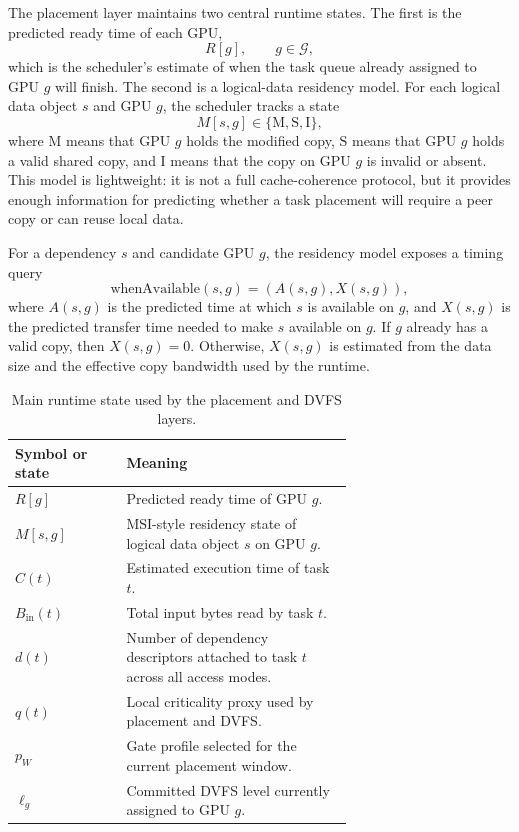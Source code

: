 The placement layer maintains two central runtime states. The first is the predicted ready time of each GPU,
\begin{equation}
R[g], \qquad g\in\mathcal{G},
\end{equation}
which is the scheduler's estimate of when the task queue already assigned to GPU $g$ will finish. The second is a logical-data residency model. For each logical data object $s$ and GPU $g$, the scheduler tracks a state
\begin{equation}
M[s,g]\in\{\mathrm{M},\mathrm{S},\mathrm{I}\},
\end{equation}
where $\mathrm{M}$ means that GPU $g$ holds the modified copy, $\mathrm{S}$ means that GPU $g$ holds a valid shared copy, and $\mathrm{I}$ means that the copy on GPU $g$ is invalid or absent. This model is lightweight: it is not a full cache-coherence protocol, but it provides enough information for predicting whether a task placement will require a peer copy or can reuse local data.

For a dependency $s$ and candidate GPU $g$, the residency model exposes a timing query
\begin{equation}
\mathrm{whenAvailable}(s,g)
=
\left(
A(s,g),X(s,g)
\right),
\end{equation}
where $A(s,g)$ is the predicted time at which $s$ is available on $g$, and $X(s,g)$ is the predicted transfer time needed to make $s$ available on $g$. If $g$ already has a valid copy, then $X(s,g)=0$. Otherwise, $X(s,g)$ is estimated from the data size and the effective copy bandwidth used by the runtime.

\begin{table}[t]
\centering
\footnotesize
\begin{tabular}{@{}lp{0.67\linewidth}@{}}
\toprule
Symbol or state & Meaning \\
\midrule
$R[g]$ & Predicted ready time of GPU $g$. \\
$M[s,g]$ & MSI-style residency state of logical data object $s$ on GPU $g$. \\
$C(t)$ & Estimated execution time of task $t$. \\
$B_{\mathrm{in}}(t)$ & Total input bytes read by task $t$. \\
$d(t)$ & Number of dependency descriptors attached to task $t$ across all access modes. \\
$q(t)$ & Local criticality proxy used by placement and DVFS. \\
$p_W$ & Gate profile selected for the current placement window. \\
$\ell_g$ & Committed DVFS level currently assigned to GPU $g$. \\
\bottomrule
\end{tabular}
\caption{Main runtime state used by the placement and DVFS layers.}
\label{tab:methods-state}
\end{table}

